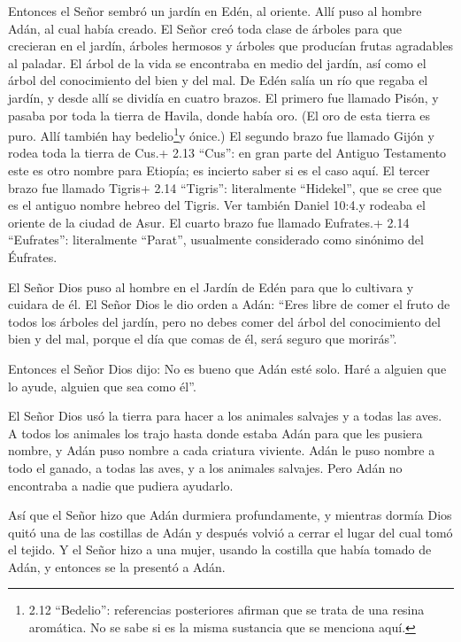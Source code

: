  Entonces el Señor sembró un jardín en Edén, al oriente.
Allí puso al hombre Adán, al cual había creado.  El Señor
creó toda clase de árboles para que crecieran en el jardín, árboles
hermosos y árboles que producían frutas agradables al paladar. El árbol
de la vida se encontraba en medio del jardín, así como el árbol del
conocimiento del bien y del mal.  De Edén salía un río que
regaba el jardín, y desde allí se dividía en cuatro brazos.
 El primero fue llamado Pisón, y pasaba por toda la tierra
de Havila, donde había oro.  (El oro de esta tierra es
puro. Allí también hay bedelio\footnote{2.12 ``Bedelio'': referencias
  posteriores afirman que se trata de una resina aromática. No se sabe
  si es la misma sustancia que se menciona aquí.}y ónice.) 
El segundo brazo fue llamado Gijón y rodea toda la tierra de Cus.+ 2.13
``Cus'': en gran parte del Antiguo Testamento este es otro nombre para
Etiopía; es incierto saber si es el caso aquí.  El tercer
brazo fue llamado Tigris+ 2.14 ``Tigris'': literalmente ``Hidekel'', que
se cree que es el antiguo nombre hebreo del Tigris. Ver también Daniel
10:4.y rodeaba el oriente de la ciudad de Asur. El cuarto brazo fue
llamado Eufrates.+ 2.14 ``Eufrates'': literalmente ``Parat'', usualmente
considerado como sinónimo del Éufrates.

 El Señor Dios puso al hombre en el Jardín de Edén para que
lo cultivara y cuidara de él.  El Señor Dios le dio orden a
Adán: ``Eres libre de comer el fruto de todos los árboles del jardín,
 pero no debes comer del árbol del conocimiento del bien y
del mal, porque el día que comas de él, será seguro que morirás''.

 Entonces el Señor Dios dijo: No es bueno que Adán esté
solo. Haré a alguien que lo ayude, alguien que sea como él''.

 El Señor Dios usó la tierra para hacer a los animales
salvajes y a todas las aves. A todos los animales los trajo hasta donde
estaba Adán para que les pusiera nombre, y Adán puso nombre a cada
criatura viviente.  Adán le puso nombre a todo el ganado, a
todas las aves, y a los animales salvajes. Pero Adán no encontraba a
nadie que pudiera ayudarlo.

 Así que el Señor hizo que Adán durmiera profundamente, y
mientras dormía Dios quitó una de las costillas de Adán y después volvió
a cerrar el lugar del cual tomó el tejido.  Y el Señor hizo
a una mujer, usando la costilla que había tomado de Adán, y entonces se
la presentó a Adán.

